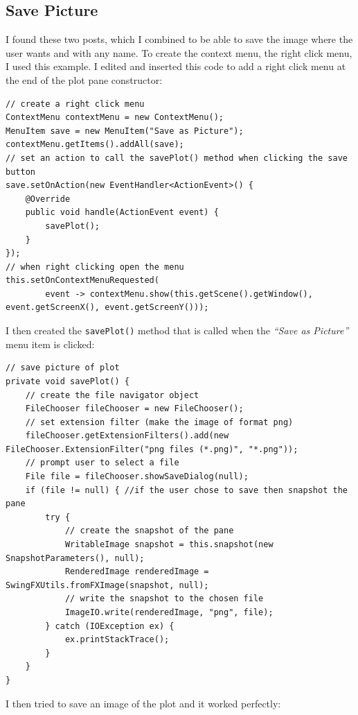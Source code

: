 \documentclass[../../../../main.tex]{subfiles}
\begin{document}
\subsection{Save Picture}
I found these two posts\cite{savePlot,snapshotJava}, which I combined to be able to save the image where the user wants and with any name. To create the context menu, the right click menu, I used this example\cite{contextMenu}. I edited and inserted this code to add a right click menu at the end of the plot pane constructor:
\begin{verbatim}
// create a right click menu
ContextMenu contextMenu = new ContextMenu();
MenuItem save = new MenuItem("Save as Picture");
contextMenu.getItems().addAll(save);
// set an action to call the savePlot() method when clicking the save button
save.setOnAction(new EventHandler<ActionEvent>() {
	@Override
	public void handle(ActionEvent event) {
		savePlot();
	}
});
// when right clicking open the menu
this.setOnContextMenuRequested(
		event -> contextMenu.show(this.getScene().getWindow(), event.getScreenX(), event.getScreenY()));
\end{verbatim}
I then created the \texttt{savePlot()} method that is called when the \textit{``Save as Picture''} menu item is clicked:
\begin{verbatim}
// save picture of plot
private void savePlot() {
	// create the file navigator object
	FileChooser fileChooser = new FileChooser();
	// set extension filter (make the image of format png)
	fileChooser.getExtensionFilters().add(new FileChooser.ExtensionFilter("png files (*.png)", "*.png"));
	// prompt user to select a file
	File file = fileChooser.showSaveDialog(null);
	if (file != null) {	//if the user chose to save then snapshot the pane
		try {
			// create the snapshot of the pane
			WritableImage snapshot = this.snapshot(new SnapshotParameters(), null);
			RenderedImage renderedImage = SwingFXUtils.fromFXImage(snapshot, null);
			// write the snapshot to the chosen file
			ImageIO.write(renderedImage, "png", file);
		} catch (IOException ex) {
			ex.printStackTrace();
		}
	}
}
\end{verbatim}
\newpage
I then tried to save an image of the plot and it worked perfectly:
\end{document}

